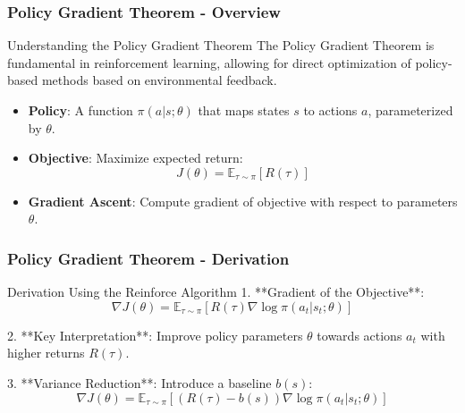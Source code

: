 \documentclass[aspectratio=169]{beamer}
\begin{document}
\begin{frame}[fragile]
    \frametitle{Policy Gradient Theorem - Overview}
    
    \begin{block}{Understanding the Policy Gradient Theorem}
        The Policy Gradient Theorem is fundamental in reinforcement learning, allowing for direct optimization of policy-based methods based on environmental feedback.
    \end{block}
    
    \begin{itemize}
        \item \textbf{Policy}: A function $\pi(a|s;\theta)$ that maps states $s$ to actions $a$, parameterized by $\theta$.
        \item \textbf{Objective}: Maximize expected return:
        \[
        J(\theta) = \mathbb{E}_{\tau \sim \pi}[R(\tau)]
        \]
        \item \textbf{Gradient Ascent}: Compute gradient of objective with respect to parameters $\theta$.
    \end{itemize}
\end{frame}

\begin{frame}[fragile]
    \frametitle{Policy Gradient Theorem - Derivation}
    
    \begin{block}{Derivation Using the Reinforce Algorithm}
        1. **Gradient of the Objective**:
        \[
        \nabla J(\theta) = \mathbb{E}_{\tau \sim \pi} \left[ R(\tau) \nabla \log \pi(a_t | s_t; \theta) \right]
        \]
        
        2. **Key Interpretation**: Improve policy parameters $\theta$ towards actions $a_t$ with higher returns $R(\tau)$.
        
        3. **Variance Reduction**: Introduce a baseline $b(s)$:
        \[
        \nabla J(\theta) = \mathbb{E}_{\tau \sim \pi} \left[ (R(\tau) - b(s)) \nabla \log \pi(a_t | s_t; \theta) \right]
        \]
    \end{block}
\end{frame}
\end{document}
